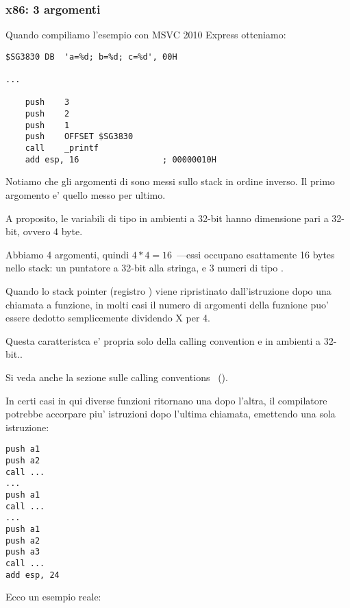 \subsubsection{x86: 3 argomenti}


Quando compiliamo l'esempio con MSVC 2010 Express otteniamo:

\begin{lstlisting}
$SG3830	DB	'a=%d; b=%d; c=%d', 00H

...

	push	3
	push	2
	push	1
	push	OFFSET $SG3830
	call	_printf
	add	esp, 16					; 00000010H
\end{lstlisting}

Notiamo che gli argomenti di \printf sono messi sullo stack in ordine inverso. Il primo argomento e' quello messo per ultimo.

A proposito, le variabili di tipo \Tint in ambienti a 32-bit hanno dimensione pari a 32-bit, ovvero 4 byte.

Abbiamo 4 argomenti, quindi $4*4 = 16$~---essi occupano esattamente 16 bytes nello stack: un puntatore a 32-bit alla stringa,  e 3 numeri di tipo \Tint.

Quando lo \gls{stack pointer} (registro \ESP) viene ripristinato dall'istruzione 
dopo una chiamata a funzione, in molti casi il numero di argomenti della fuznione puo' essere dedotto semplicemente dividendo X per 4.

Questa caratteristca  e' propria solo della calling convention  e in ambienti a 32-bit..

Si veda anche la sezione sulle calling conventions ~().

In certi casi in qui diverse funzioni ritornano una dopo l'altra, il compilatore potrebbe accorpare piu' istruzioni  
dopo l'ultima chiamata, emettendo una sola istruzione:

\begin{lstlisting}
push a1
push a2
call ...
...
push a1
call ...
...
push a1
push a2
push a3
call ...
add esp, 24
\end{lstlisting}

Ecco un esempio reale:



\clearpage
{}
\myindex{\olly}

